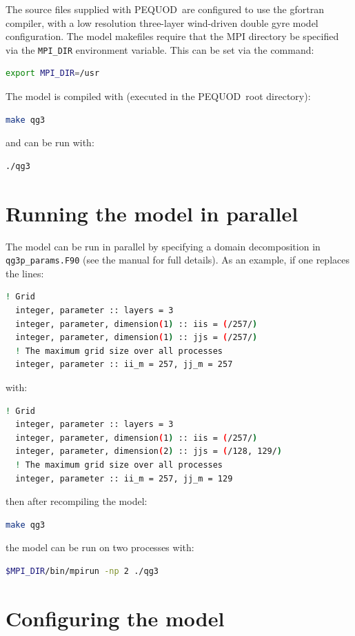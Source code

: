 \documentclass[a4paper]{article}
\newcommand{\pequod}{PEQUOD}
\begin{document}
The source files supplied with \pequod\ are configured to use the gfortran
compiler, with a low resolution three-layer wind-driven double gyre model
configuration. The model makefiles require that the MPI directory be specified
via the \verb+MPI_DIR+ environment variable. This can be set via the command:
\begin{lstlisting}[language = bash, frame = single]
export MPI_DIR=/usr
\end{lstlisting}
The model is compiled with (executed in the \pequod\ root directory):
\begin{lstlisting}[language = bash, frame = single]
make qg3
\end{lstlisting}
and can be run with:
\begin{lstlisting}[language = bash, frame = single]
./qg3
\end{lstlisting}

\section{Running the model in parallel}

The model can be run in parallel by specifying a domain decomposition in
\verb+qg3p_params.F90+ (see the manual for full details). As an example, if
one replaces the lines:
\begin{lstlisting}[language = bash, frame = single]
  ! Grid
  integer, parameter :: layers = 3
  integer, parameter, dimension(1) :: iis = (/257/)
  integer, parameter, dimension(1) :: jjs = (/257/)
  ! The maximum grid size over all processes
  integer, parameter :: ii_m = 257, jj_m = 257
\end{lstlisting}
with:
\begin{lstlisting}[language = bash, frame = single]
  ! Grid
  integer, parameter :: layers = 3
  integer, parameter, dimension(1) :: iis = (/257/)
  integer, parameter, dimension(2) :: jjs = (/128, 129/)
  ! The maximum grid size over all processes
  integer, parameter :: ii_m = 257, jj_m = 129
\end{lstlisting}
then after recompiling the model:
\begin{lstlisting}[language = bash, frame = single]
make qg3
\end{lstlisting}
the model can be run on two processes with:
\begin{lstlisting}[language = bash, frame = single]
$MPI_DIR/bin/mpirun -np 2 ./qg3
\end{lstlisting}

\section{Configuring the model}
\end{document}
